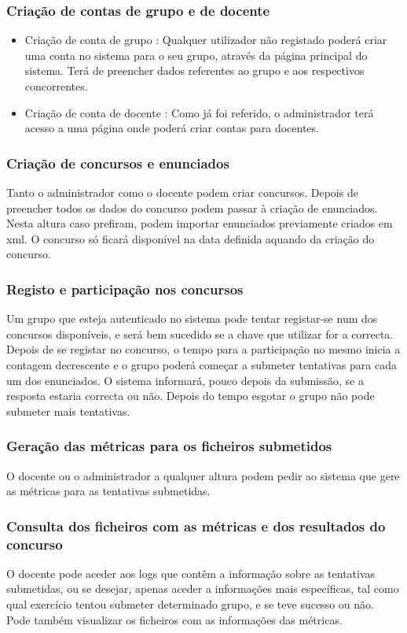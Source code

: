 \subsubsection{Criação de contas de grupo e de docente}
\begin{itemize}
 \item Criação de conta de grupo : Qualquer utilizador não registado poderá criar uma conta no sistema para o seu grupo, através da página principal do sistema.
Terá de preencher dados referentes ao grupo e aos respectivos concorrentes.
 \item Criação de conta de docente : Como já foi referido, o administrador terá acesso a uma página onde poderá criar contas para docentes.
\end{itemize}

\subsubsection{Criação de concursos e enunciados}
Tanto o administrador como o docente podem criar concursos. Depois de preencher todos os dados do concurso podem passar à criação de enunciados.
Nesta altura caso prefiram, podem importar enunciados previamente criados em xml.
O concurso só ficará disponível na data definida aquando da criação do concurso.

\subsubsection{Registo e participação nos concursos}
Um grupo que esteja autenticado no sistema pode tentar registar-se num dos concursos disponíveis, e será bem sucedido se a chave que utilizar for a correcta.\\
Depois de se registar no concurso, o tempo para a participação no mesmo inicia a contagem decrescente e o grupo poderá começar a submeter tentativas para
cada um dos enunciados. O sistema informará, pouco depois da submissão, se a resposta estaria correcta ou não.
Depois do tempo esgotar o grupo não pode submeter mais tentativas.

\subsubsection{Geração das métricas para os ficheiros submetidos}
O docente ou o administrador a qualquer altura podem pedir ao sistema que gere as métricas para as tentativas submetidas.

\subsubsection{Consulta dos ficheiros com as métricas e dos resultados do concurso}
O docente pode aceder aos logs que contêm a informação sobre as tentativas submetidas, ou se desejar, apenas aceder a informações mais específicas, tal como 
qual exercício tentou submeter determinado grupo, e se teve sucesso ou não.\\
Pode também visualizar os ficheiros com as informações das métricas.


